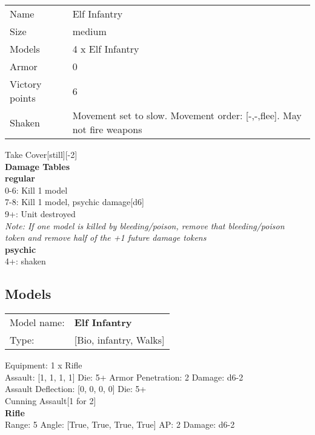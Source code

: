 \begin{tabular}{ll}
  Name & Elf Infantry \\
  Size & medium\\
  Models & 4 x Elf Infantry\\
  Armor & 0\\
  Victory points & 6\\
  Shaken & Movement set to slow. Movement order: [-,-,flee]. May not fire weapons\\
\end{tabular}

Take Cover[still][-2]\\ 



{\bf Damage Tables} \\
 {\bf regular } \\
0-6: Kill 1 model \\
7-8: Kill 1 model, psychic damage[d6] \\
9+: Unit destroyed \\
{{\it Note: If one model is killed by bleeding/poison, remove that bleeding/poison \\ token and remove half of the +1 future damage tokens}} \\
 {\bf psychic } \\
4+: shaken \\


\clearpage

\subsection{ Models }

\begin{tabular}{ll}
Model name: & {\bf Elf Infantry } \\
Type: & [Bio, infantry, Walks] \\
\end{tabular}

Equipment: 1 x Rifle \\

Assault: [1, 1, 1, 1] Die: 5+ Armor Penetration: 2 Damage: d6-2 \\
Assault Deflection: [0, 0, 0, 0] Die: 5+\\
\indent Cunning Assault[1 for 2]\\ 
 



{\bf Rifle } \\



Range: 5  Angle: [True, True, True, True] AP: 2 Damage: d6-2 \\




 















\clearpage
